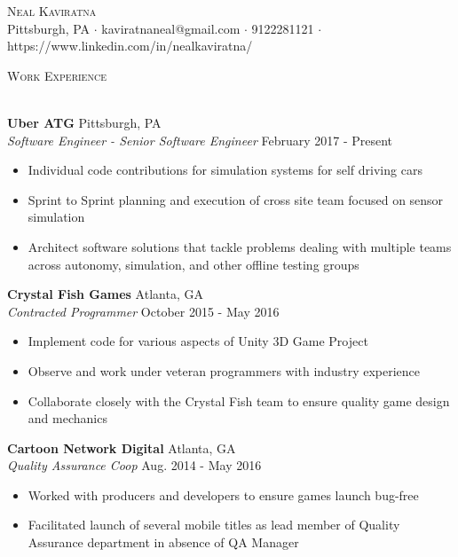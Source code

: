 \documentclass[a4paper]{article}
\newcommand{\lineunder} {
    \vspace*{-8pt} \\
    \hspace*{-18pt} \hrulefill \\
}
\newcommand{\header} [1] {
    {\hspace*{-18pt}\vspace*{6pt} \textsc{#1}}
    \vspace*{-6pt} \lineunder
}
\begin{document}
\vspace*{-40pt}

    

\vspace*{-10pt}
\begin{center}
	{\Huge \scshape {Neal Kaviratna}}\\
	Pittsburgh, PA $\cdot$ kaviratnaneal@gmail.com $\cdot$ 9122281121 $\cdot$ https://www.linkedin.com/in/nealkaviratna/\\
\end{center}

\header{Work Experience}
\vspace{1mm}

\textbf{Uber ATG} \hfill Pittsburgh, PA\\
\textit{Software Engineer - Senior Software Engineer} \hfill February 2017 - Present\\
\vspace{-1mm}
\begin{itemize} \itemsep 1pt
	\item Individual code contributions for simulation systems for self driving cars
	\item Sprint to Sprint planning and execution of cross site team focused on sensor simulation
	\item Architect software solutions that tackle problems dealing with multiple teams across autonomy, simulation, and other offline testing groups
\end{itemize}
\textbf{Crystal Fish Games} \hfill Atlanta, GA\\
\textit{Contracted Programmer} \hfill October 2015 - May 2016\\
\vspace{-1mm}
\begin{itemize} \itemsep 1pt
	\item Implement code for various aspects of Unity 3D Game Project
	\item Observe and work under veteran programmers with industry experience
	\item Collaborate closely with the Crystal Fish team to ensure quality game design and mechanics
\end{itemize}
\textbf{Cartoon Network Digital} \hfill Atlanta, GA\\
\textit{Quality Assurance Coop} \hfill Aug. 2014 - May 2016\\
\vspace{-1mm}
\begin{itemize} \itemsep 1pt
	\item Worked with producers and developers to ensure games launch bug-free
	\item Facilitated launch of several mobile titles as lead member of Quality Assurance department in absence of QA Manager
\end{itemize}
\end{document}
